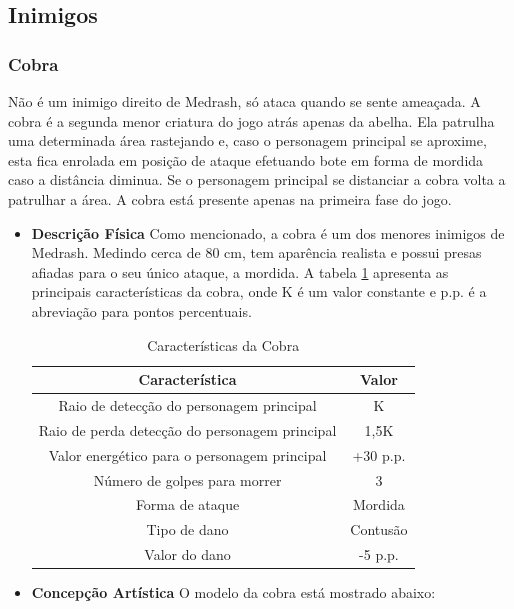 \subsection{Inimigos}
\subsubsection{Cobra}
Não é um inimigo direito de Medrash, só ataca quando se sente ameaçada. A
 cobra é a segunda menor criatura do jogo atrás apenas da abelha. Ela
 patrulha uma determinada área rastejando e, caso o personagem principal se
 aproxime, esta fica enrolada em posição de ataque efetuando bote em forma
 de mordida caso a distância diminua. Se o personagem principal se
 distanciar a cobra volta a patrulhar a área. A cobra está presente apenas
 na primeira fase do jogo.
\begin{itemize}
\item {\bf Descrição Física}
Como mencionado, a cobra é um dos menores inimigos de Medrash. Medindo
 cerca de 80 cm, tem aparência realista e possui presas afiadas para o seu
 único ataque, a mordida. A tabela \ref{table:cobra} apresenta as principais
 características da cobra, onde K é um valor constante e p.p. é a
 abreviação para pontos percentuais.
\begin{table}[H]
\begin{center}
\begin{tabular}{|c|c|}
\hline 
\textbf{Característica} & \textbf{Valor} \\ 
\hline 
Raio de detecção do personagem principal & K \\ 
\hline 
Raio de perda detecção do personagem principal & 1,5K \\ 
\hline 
Valor energético para o personagem principal & +30 p.p. \\ 
\hline 
Número de golpes para morrer & 3 \\ 
\hline 
Forma de ataque & Mordida \\ 
\hline 
Tipo de dano & Contusão \\ 
\hline 
Valor do dano & -5 p.p. \\ 
\hline 
\end{tabular} 
\end{center}
\caption{Características da Cobra}
\label{table:cobra}
\end{table}
\item {\bf Concepção Artística}
O modelo da cobra está mostrado abaixo:



\end{itemize}
